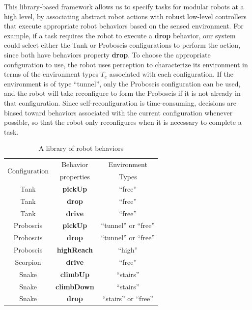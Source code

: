 \documentclass[journal]{IEEEtran}
\begin{document}
This library-based framework allows us to specify tasks for modular robots at a high level, by associating abstract robot actions with robust low-level controllers that execute appropriate robot behaviors based on the sensed environment.
For example, if a task requires the robot to execute a \textbf{drop} behavior, our system could select either the Tank or Proboscis configurations to perform the action, since both have behaviors property \textbf{drop}. To choose the appropriate configuration to use, the robot uses perception to characterize its environment in terms of the environment types $T_e$ associated with each configuration. If the environment is of type ``tunnel'', only the Proboscis configuration can be used, and the robot will take  reconfigure to form the Proboscis if it is not already in that configuration. Since self-reconfiguration is time-consuming, decisions are biased toward behaviors associated with the current configuration whenever possible, so that the robot only reconfigures when it is necessary to complete a task.
%
\begin{table}
\centering
\begin{tabular}{ |c|c|c| } 
 \hline
 \multirow{2}{6em}{Configuration} & Behavior & Environment \\
 & properties & Types \\
 \hline
 Tank & \textbf{pickUp} & ``free'' \\\hline
 Tank & \textbf{drop} & ``free'' \\\hline
 Tank & \textbf{drive} & ``free''\\ \hline
 Proboscis & \textbf{pickUp} & ``tunnel'' or ``free''\\ \hline
 Proboscis & \textbf{drop} &``tunnel'' or ``free'' \\ \hline
 Proboscis & \textbf{highReach} & ``high''\\ \hline
 Scorpion & \textbf{drive} & ``free''\\ \hline
 Snake & \textbf{climbUp} & ``stairs''\\ \hline
 Snake & \textbf{climbDown} & ``stairs''\\ \hline
 Snake & \textbf{drop} & ``stairs'' or ``free''\\
 \hline
\end{tabular}
\caption{A library of robot behaviors}
\label{table:1}
\vspace{-1em}
\end{table}

\end{document}
